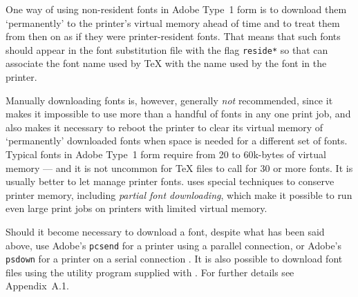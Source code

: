 
One way of using non-resident fonts in Adobe Type~1 form is to download
them `permanently' to the printer's virtual memory ahead of time and
to treat them from then on as if they were printer-resident fonts.
That means that such fonts should appear in the font substitution file
with the flag {\tt *reside*}
so that {\DVIPSONE} can associate the font name used by {\TeX} with the
{\PS} name used by the font in the printer.

Manually downloading fonts is, however, generally {\it not\/} 
recommended, since it makes it impossible to use more than a handful of
fonts in any one print job, and also makes it necessary to reboot the
printer to clear its virtual memory of `permanently' downloaded fonts
when space is needed for a different set of fonts.
Typical fonts in Adobe Type~1 form require from 20 to 60k-bytes of 
virtual memory --- and it is not uncommon for {\TeX} {\DVI} files to call
for 30 or more fonts.
%
It is usually better %
to let {\DVIPSONE} manage %
printer fonts.  
{\DVIPSONE} uses special techniques to conserve printer memory,
including {\it partial font downloading}, which make it possible to run
even large print jobs on printers with limited virtual memory.

Should it become necessary to download a font, despite what has been
said above, use Adobe's {\tt pcsend} for a printer using a parallel
connection, or Adobe's {\tt psdown} for a printer on a serial connection%
.
It is also possible to download font files using the utility program 
{\DOWNLOAD} supplied with {\DVIPSONE}. %
For further details see Appendix~A.1. %


